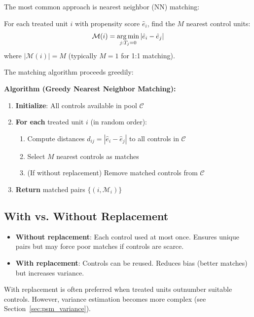 The most common approach is nearest neighbor (NN) matching:

\begin{definition}
\label{def:nn_matching}
For each treated unit $i$ with propensity score $\hat{e}_i$, find the $M$ nearest control units:
\begin{equation}
\mathcal{M}(i) = \operatorname*{arg\,min}_{j: T_j = 0} |\hat{e}_i - \hat{e}_j|
\label{eq:nn_match}
\end{equation}
where $|\mathcal{M}(i)| = M$ (typically $M = 1$ for 1:1 matching).
\end{definition}

The matching algorithm proceeds greedily:

\medskip
\noindent\textbf{Algorithm (Greedy Nearest Neighbor Matching):}
\label{alg:greedy_nn}
\begin{enumerate}
    \item \textbf{Initialize}: All controls available in pool $\mathcal{C}$
    \item \textbf{For each} treated unit $i$ (in random order):
    \begin{enumerate}
        \item Compute distances $d_{ij} = |\hat{e}_i - \hat{e}_j|$ to all controls in $\mathcal{C}$
        \item Select $M$ nearest controls as matches
        \item (If without replacement) Remove matched controls from $\mathcal{C}$
    \end{enumerate}
    \item \textbf{Return} matched pairs $\{(i, \mathcal{M}_i)\}$
\end{enumerate}

\subsection{With vs. Without Replacement}

\begin{itemize}
    \item \textbf{Without replacement}: Each control used at most once. Ensures unique pairs but may force poor matches if controls are scarce.
    \item \textbf{With replacement}: Controls can be reused. Reduces bias (better matches) but increases variance.
\end{itemize}

\begin{insight}
With replacement is often preferred when treated units outnumber suitable controls. However, variance estimation becomes more complex (see Section~\ref{sec:psm_variance}).
\end{insight}

